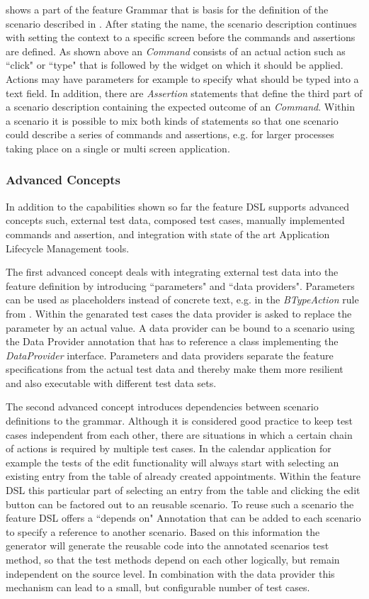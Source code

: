 \documentclass{sig-alternate-05-2015}
\begin{document}
 shows a part of the feature Grammar that is basis for the definition of the scenario described in .
After stating the name, the scenario description continues with setting the context to a specific screen before the commands and assertions are defined.
As shown above an \textit{Command} consists of an actual action such as ``click" or ``type" that is followed by the widget on which it should be applied.
Actions may have parameters for example to specify what should be typed into a text field. 
In addition, there are \textit{Assertion} statements that define the third part of a scenario description containing the expected outcome of an \textit{Command}.
Within a scenario it is possible to mix both kinds of statements so that one scenario could describe a series of commands and assertions, e.g. for larger processes taking place on a single or multi screen application.   

\subsubsection{Advanced Concepts}
In addition to the capabilities shown so far the feature DSL supports advanced concepts such, external test data, composed test cases, manually implemented commands and assertion, and integration with state of the art Application Lifecycle Management tools.
 
The first advanced concept deals with integrating external test data into the feature definition by introducing ``parameters" and ``data providers".
Parameters can be used as placeholders instead of concrete text, e.g. in the \textit{BTypeAction} rule from .
Within the genarated test cases the data provider is asked to replace the parameter by an actual value.
A data provider can be bound to a scenario using the Data Provider annotation that has to reference a class implementing the \textit{DataProvider} interface.
Parameters and data providers separate the feature specifications from the actual test data and thereby make them more resilient and also executable with different test data sets.

The second advanced concept introduces dependencies between scenario definitions to the grammar.
Although it is considered good practice to keep test cases independent from each other, there are situations in which a certain chain of actions is required by multiple test cases.
In the calendar application for example the tests of the edit functionality will always start with selecting an existing entry from the table of already created appointments.
Within the feature DSL this particular part of selecting an entry from the table and clicking the edit button can be factored out to an reusable scenario.
To reuse such a scenario the feature DSL offers a ``depends on" Annotation that can be added to each scenario to specify a reference to another scenario.
Based on this information the generator will generate the reusable code into the annotated scenarios test method, so that the test methods depend on each other logically, but remain independent on the source level.
In combination with the data provider this mechanism can lead to a small, but configurable number of test cases.
\end{document}
